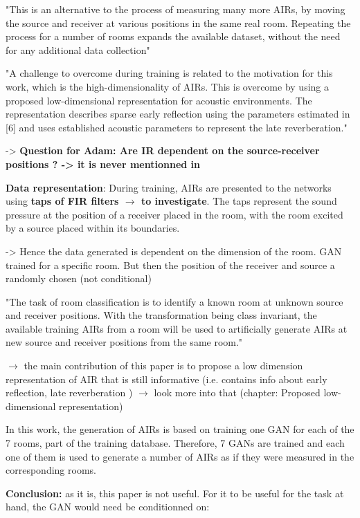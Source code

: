\documentclass{article}
\begin{document}
"This is an alternative to the process of measuring many more AIRs, by moving the source and receiver at various positions in the same real room. Repeating the process for a number of rooms expands the available dataset, without the need for any additional data collection"

"A challenge to overcome during training is related to the motivation for this work, which is the high-dimensionality of AIRs. This is overcome by using a proposed low-dimensional representation for acoustic environments. The representation describes sparse early reflection using the parameters estimated in [6] and uses established acoustic parameters to represent the late reverberation."

-> \textbf{Question for Adam: Are IR dependent on the source-receiver positions ? -> it is never mentionned in \cite{papayiannis2019data}}

\textbf{Data representation}: During training, AIRs are presented to the networks using \textbf{taps of FIR filters $\rightarrow$ to investigate}. The taps represent the sound pressure at the position of a receiver placed in the room, with the room excited by a source placed within its boundaries.

-> Hence the data generated is dependent on the dimension of the room. GAN trained for a specific room. But then the position of the receiver and source a randomly chosen (not conditional)

"The task of room classification is to identify a known room at unknown source and receiver positions. With the transformation being class invariant, the available training AIRs from a room will be used to artificially generate AIRs at new source and receiver positions from the same room."

$\rightarrow$ the main contribution of this paper is to propose a low dimension representation of AIR that is still informative (i.e. contains info about early reflection, late reverberation ) $\rightarrow$ look more into that (chapter: Proposed low-dimensional representation)

In this work, the generation of AIRs is based on training one GAN for each of the 7 rooms, part of the training database. Therefore, 7 GANs are trained and each one of them is used to generate a number of AIRs as if they were measured in the corresponding rooms.

\textbf{Conclusion:} as it is, this paper is not useful. For it to be useful for the task at hand, the GAN would need be conditionned on:
\end{document}
